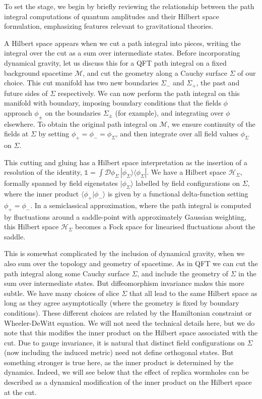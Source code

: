 \documentclass[letterpaper,12pt]{article}
\newcommand*{\hilb}{\mathcal{H}}	%
\newcommand*{\id}{\mathds{1}}
\begin{document}
To set the stage, we begin by briefly reviewing the relationship between the path integral computations of quantum amplitudes and their Hilbert space formulation, emphasizing features relevant to gravitational theories.

A Hilbert space appears when we cut a path integral into pieces, writing the integral over the cut as a sum over intermediate states. Before incorporating dynamical gravity, let us discuss this for a QFT path integral on a fixed background spacetime $\mathcal{M}$, and cut the geometry along a Cauchy surface $\Sigma$ of our choice. This cut manifold has two new boundaries $\Sigma_-$ and $\Sigma_+$, the past and future sides of $\Sigma$ respectively. We can now perform the path integral on this manifold with boundary, imposing boundary conditions that the fields $\phi$ approach $\phi_\pm$ on the boundaries $\Sigma_\pm$ (for example), and integrating over $\phi$ elsewhere. To obtain the original path integral on $\mathcal{M}$, we ensure continuity of the fields at $\Sigma$ by setting $\phi_+=\phi_-=\phi_\Sigma$, and then integrate over all field values $\phi_\Sigma$ on $\Sigma$.

This cutting and gluing has a Hilbert space interpretation as the insertion of a resolution of the identity, $\id = \int \mathcal{D}\phi_\Sigma \, |\phi_\Sigma\rangle \langle\phi_\Sigma|$. We have a Hilbert space $\hilb_\Sigma$, formally spanned by field eigenstates $ |\phi_\Sigma\rangle$ labelled by field configurations on $\Sigma$, where the inner product $\langle\phi_+|\phi_-\rangle$ is given by a functional delta-function setting $\phi_+=\phi_-$. In a semiclassical approximation, where the path integral is computed by fluctuations around a saddle-point with approximately Gaussian weighting, this Hilbert space $\hilb_\Sigma$ becomes a Fock space for linearised fluctuations about the saddle.

This is somewhat complicated by the inclusion of dynamical gravity, when we also sum over the topology and geometry of spacetime. As in QFT we can cut the path integral along some Cauchy surface $\Sigma$, and include the geometry of $\Sigma$ in the sum over intermediate states. But diffeomorphism invariance makes this more subtle. We have many choices of slice $\Sigma$ that all lead to the same Hilbert space as long as they agree asymptotically (where the geometry is fixed by boundary conditions). These different choices are related by the Hamiltonian constraint or Wheeler-DeWitt equation. We will not need the technical details here, but we do note that this modifies the inner product on the Hilbert space associated with the cut.  Due to gauge invariance, it is natural that distinct field configurations on $\Sigma$ (now including the induced metric) need not define orthogonal states.  But something stronger is true here,  as the inner product is determined by the dynamics. Indeed, we will see below that the effect of replica wormholes can be described as a dynamical modification of the inner product on the Hilbert space at the cut.
\end{document}
